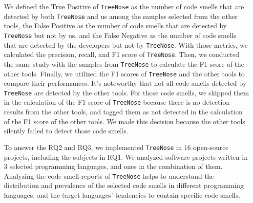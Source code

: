 We defined the True Positive of \texttt{TreeNose} as the number of code smells
that are detected by both \texttt{TreeNose} and us among the %
samples selected from the other tools, the False Positive as the number of code
smells that are detected by \texttt{TreeNose} but not by us, and %
the False Negative as the number of code smells that are detected by the
developers but not by \texttt{TreeNose}. With those metrics, we calculated the
precision, recall, and F1 score of \texttt{TreeNose}. Then, we conducted the
same study with the samples from \texttt{TreeNose} to calculate the F1 score of
the other tools. Finally, we utilized the F1 scores of \texttt{TreeNose} and
the other tools to compare their performances. It's noteworthy that not all
code smells detected by \texttt{TreeNose} are detected by the other tools. For
those code smells, we skipped them in the calculation of the F1 score of
\texttt{TreeNose} because there is no detection results from the other tools,
and tagged them as not detected in the calculation of the F1 score of the other
tools. We made this decision because the other tools silently failed to detect
those code smells.

To answer the RQ2 and RQ3, we implemented \texttt{TreeNose} in 16 open-source
projects, including the subjects in RQ1. We analyzed software projects written
in 3 selected programming languages, and ones in the
%
%
combination of them.
%
%
Analyzing the code smell reports of \texttt{TreeNose} helps to understand the
distribution and prevalence of the selected code smells in different
programming languages, and the target languages' tendencies to contain specific
code smells.


